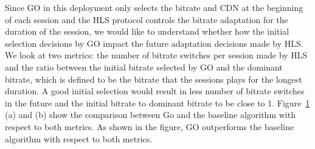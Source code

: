 Since GO in this deployment only selects the bitrate and CDN at the beginning of each session and the HLS protocol controls the bitrate adaptation for the duration of the session, we would like to understand whether how the initial selection decisions by GO impact the future adaptation decisions made by HLS. 
We look at two metrics: the number of bitrate switches per session made by HLS and the ratio between the initial bitrate selected by GO and the dominant bitrate, which is defined to be the bitrate that the sessions plays for the longest duration. A good initial selection would result in less number of bitrate switches in the future and the initial bitrate to dominant bitrate to be close to 1. 
Figure~\ref{fig:bitrate-stability} (a) and (b) show the comparison between Go and the baseline algorithm with respect to both metrics.  As shown in the figure, GO outperforms the baseline algorithm with respect to both metrics. 



\begin{figure}[h!]
\centering
{}
\hspace{-0.6cm}
\label{fig:bitrate-stability}
\end{figure}



